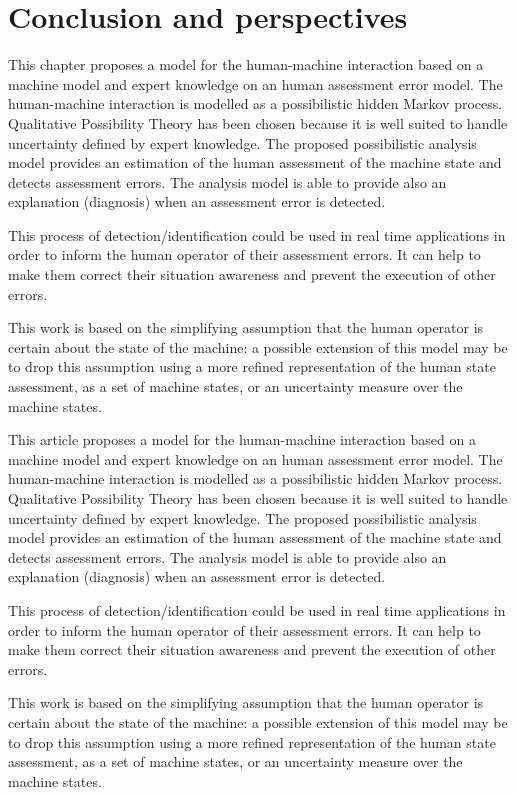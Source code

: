 \section{Conclusion and perspectives}
This chapter proposes a model for the human-machine interaction based 
on a machine model and expert knowledge on an human assessment error model.
The human-machine interaction is modelled as a possibilistic hidden Markov process. 
Qualitative Possibility Theory has been chosen because 
it is well suited to handle uncertainty defined by expert knowledge. 
The proposed possibilistic analysis model provides 
an estimation of the human assessment of the machine state 
and detects assessment errors. 
The analysis model is able to provide also an explanation (diagnosis) 
when an assessment error is detected.

This process of detection/identification 
could be used in real time applications in order to 
inform the human operator of their assessment errors.
It can help to make them correct their situation awareness 
and prevent the execution of other errors.

This work is based on the simplifying assumption 
that the human operator is certain about the state 
of the machine: a possible extension of this model 
may be to drop this assumption using a more refined 
representation of the human state assessment, 
as a set of machine states, or an uncertainty 
measure over the machine states.

This article proposes a model for the human-machine interaction based 
on a machine model and expert knowledge on an human assessment error model.
The human-machine interaction is modelled as a possibilistic hidden Markov process. 
Qualitative Possibility Theory has been chosen because 
it is well suited to handle uncertainty defined by expert knowledge. 
The proposed possibilistic analysis model provides 
an estimation of the human assessment of the machine state 
and detects assessment errors. 
The analysis model is able to provide also an explanation (diagnosis) 
when an assessment error is detected.

This process of detection/identification 
could be used in real time applications in order to 
inform the human operator of their assessment errors.
It can help to make them correct their situation awareness 
and prevent the execution of other errors.

This work is based on the simplifying assumption 
that the human operator is certain about the state 
of the machine: a possible extension of this model 
may be to drop this assumption using a more refined 
representation of the human state assessment, 
as a set of machine states, or an uncertainty 
measure over the machine states.

